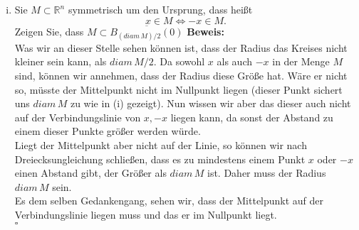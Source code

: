 \documentclass[11pt,a4paper,ngerman]{article}
\begin{document}
\begin{enumerate}[(i)]
		\item Sie $M \subset \mathbb{R}^n$ symmetrisch um den Ursprung, dass heißt
			$$
				x \in M \Longleftrightarrow -x \in M.
			$$
			Zeigen Sie, dass $M \subset \overline{B_{(diam \, M )/ 2}(0)}$
		\textbf{Beweis:}\\
            Was wir an dieser Stelle sehen können ist, dass der Radius das Kreises nicht
            kleiner sein kann, als $diam \, M / 2$. Da sowohl $x$ als auch $-x$ in der Menge
            $M$ sind, können wir annehmen, dass der Radius diese Größe hat. Wäre
            er nicht so, müsste der Mittelpunkt nicht im Nullpunkt liegen (dieser Punkt sichert
            uns $diam \, M$ zu wie in (i) gezeigt). Nun wissen wir aber das dieser auch nicht
            auf der Verbindungslinie von $x, -x$ liegen kann, da sonst der Abstand zu einem
            dieser Punkte größer werden würde.\\
            Liegt der Mittelpunkt aber nicht auf der Linie, so können wir nach Dreiecksungleichung
            schließen, dass es zu mindestens einem Punkt $x$ oder $-x$ einen Abstand gibt,
            der Größer als $diam \, M$ ist. Daher muss der Radius $diam \, M$ sein.\\
            Es dem selben Gedankengang, sehen wir, dass der Mittelpunkt auf der Verbindungslinie
            liegen muss und das er im Nullpunkt liegt.\\

            \mbox{} \hfill $\square$
			
	\end{enumerate}

\label{LastPage}
\end{document}
